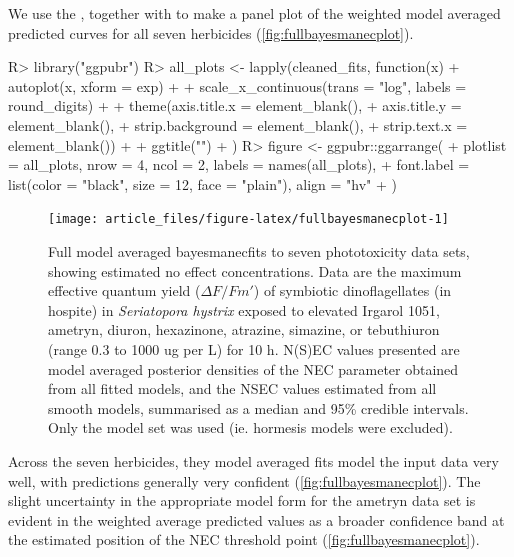 \documentclass[
  shortnames]{jss}
\begin{document}
We use the  , together with  \citep{ggpubr} to make a panel plot of the weighted model averaged predicted curves for all seven herbicides (\autoref{fig:fullbayesmanecplot}).

\begin{CodeChunk}
\begin{CodeInput}
R> library("ggpubr")
R> all_plots <- lapply(cleaned_fits, function(x) {
+   autoplot(x, xform = exp) +
+   scale_x_continuous(trans = "log", labels = round_digits) +
+   theme(axis.title.x = element_blank(),
+          axis.title.y = element_blank(),
+          strip.background = element_blank(),
+          strip.text.x = element_blank()) +
+     ggtitle("")
+ })
R> figure <- ggpubr::ggarrange(
+   plotlist = all_plots, nrow = 4, ncol = 2, labels = names(all_plots),
+   font.label = list(color = "black", size = 12, face = "plain"), align = "hv"
+ )
\end{CodeInput}
\end{CodeChunk}

\begin{CodeChunk}
\begin{figure}[!ht]

{\centering \texttt{[image: article\_files/figure-latex/fullbayesmanecplot-1]} 

}

\caption{Full model averaged bayesmanecfits to seven phototoxicity data sets, showing estimated no effect concentrations. Data are the maximum effective quantum yield ($\Delta F / Fm'$) of symbiotic dinoflagellates (in hospite) in \textit{Seriatopora hystrix} exposed to elevated Irgarol 1051, ametryn, diuron, hexazinone, atrazine, simazine, or tebuthiuron (range 0.3 to 1000 ug per L) for 10 h. N(S)EC values presented are model averaged posterior densities of the NEC parameter obtained from all fitted  models, and the NSEC values estimated from all smooth  models, summarised as a median and 95\% credible intervals. Only the  model set was used (ie. hormesis models were excluded).}\label{fig:fullbayesmanecplot}
\end{figure}
\end{CodeChunk}

Across the seven herbicides, they  model averaged fits model the input data very well, with predictions generally very confident (\autoref{fig:fullbayesmanecplot}). The slight uncertainty in the appropriate model form for the ametryn data set is evident in the weighted average predicted values as a broader confidence band at the estimated position of the NEC threshold point (\autoref{fig:fullbayesmanecplot}).
\end{document}
